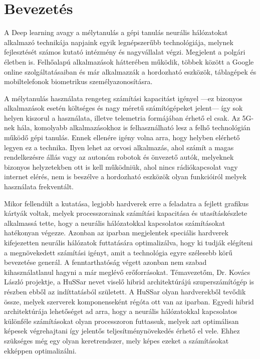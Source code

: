 \chapter*{Bevezetés}
A Deep learning avagy a mélytanulás a gépi tanulás neurális hálózatokat alkalmazó technikája napjaink egyik legnépszerűbb technológiája, melynek fejlesztését számos kutató intézmény és nagyvállalat végzi.
Megjelent a polgári életben is. Felhőalapú alkalmazások hátterében működik, többek között a Google online szolgáltatásaiban és már alkalmazzák a hordozható eszközök, táblagépek és mobiltelefonok biometrikus személyazonosításra. 

A mélytanulás használata rengeteg számítási kapacitást igényel ---ez bizonyos alkalmazások esetén költséges és nagy méretű számítógépeket jelent--- így sok helyen kiszorul a használata, illetve telemetria formájában érhető el csak.
Az 5G-nek hála, komolyabb alkalmazásokhoz is felhasználható lesz a felhő technológián működő gépi tanulás.
Ennek ellenére igény volna arra, hogy helyben elérhető legyen ez a technika. 
Ilyen lehet az orvosi alkalmazás, ahol számít a magas rendelkezésre állás vagy az autonóm robotok és önvezető autók, melyeknek bizonyos helyzetekben ott is kell működniük, ahol nincs rádiókapcsolat vagy internet elérés, nem is beszélve a hordozható eszközök olyan funkcióiról melyek használata frekventált.

Mikor fellendült a kutatása, legjobb hardverek erre a feladatra a fejlett grafikus kártyák voltak, melyek processzorainak számítási kapacitása és utasításkészlete alkalmassá tette, hogy a neurális hálózatokkal kapcsolatos számításokat hatékonyan végezze.
Azonban az iparban megjelentek speciális hardverek kifejezetten neurális hálózatok futtatására optimalizálva, hogy ki tudják elégíteni a megnövekedett számítási igényt, amit a technológia egyre szélesebb körű bevezetése generál.
A fenntarthatóság végett azonban nem szabad kihasználatlanul hagyni a már meglévő erőforrásokat. Témavezetőm, Dr. Kovács László projektje, a HuSSar nevet viselő hibrid architektúrájú szuperszámítógép is részben ebből az indíttatásból született. A HuSSar olyan hardverekből tevődik össze, melyek szerverek komponenseként régóta ott van az iparban. Egyedi hibrid architektúrája lehetőséget ad arra, hogy a neurális hálózatokkal kapcsolatos különféle számításokat olyan processzoron futtassuk, melyek azt optimálisan képesek végrehajtani így jelentős teljesítménynövekedés érhető el vele.
Ehhez szükséges még egy olyan keretrendszer, mely képes ezeket a számításokat ekképpen optimalizálni.

